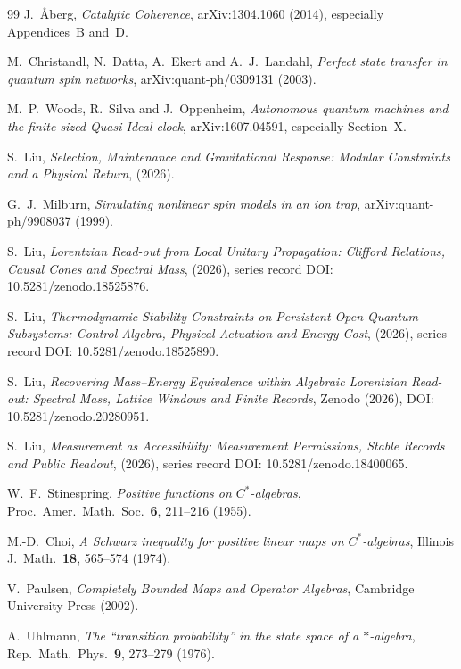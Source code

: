\begin{thebibliography}{99}
J.~\AA berg, \emph{Catalytic Coherence}, arXiv:1304.1060 (2014), especially Appendices~B and~D.

M.~Christandl, N.~Datta, A.~Ekert and A.~J.~Landahl,
\emph{Perfect state transfer in quantum spin networks}, arXiv:quant-ph/0309131 (2003).

M.~P.~Woods, R.~Silva and J.~Oppenheim,
\emph{Autonomous quantum machines and the finite sized Quasi-Ideal clock},
arXiv:1607.04591, especially Section~X.

S.~Liu, \emph{Selection, Maintenance and Gravitational Response: Modular Constraints and a Physical Return}, (2026).

G.~J.~Milburn, \emph{Simulating nonlinear spin models in an ion trap}, arXiv:quant-ph/9908037 (1999).

S.~Liu, \emph{Lorentzian Read-out from Local Unitary Propagation: Clifford Relations, Causal Cones and Spectral Mass}, (2026), series record DOI: 10.5281/zenodo.18525876.

S.~Liu, \emph{Thermodynamic Stability Constraints on Persistent Open Quantum Subsystems: Control Algebra, Physical Actuation and Energy Cost}, (2026), series record DOI: 10.5281/zenodo.18525890.

S.~Liu, \emph{Recovering Mass--Energy Equivalence within Algebraic Lorentzian Read-out: Spectral Mass, Lattice Windows and Finite Records}, Zenodo (2026), DOI: 10.5281/zenodo.20280951.

S.~Liu, \emph{Measurement as Accessibility: Measurement Permissions, Stable Records and Public Readout}, (2026), series record DOI: 10.5281/zenodo.18400065.

W.~F.~Stinespring, \emph{Positive functions on $C^*$-algebras}, Proc.\ Amer.\ Math.\ Soc.\ \textbf{6}, 211--216 (1955).

M.-D.~Choi, \emph{A Schwarz inequality for positive linear maps on $C^*$-algebras}, Illinois J.\ Math.\ \textbf{18}, 565--574 (1974).

V.~Paulsen, \emph{Completely Bounded Maps and Operator Algebras}, Cambridge University Press (2002).

A.~Uhlmann, \emph{The ``transition probability'' in the state space of a $*$-algebra}, Rep.\ Math.\ Phys.\ \textbf{9}, 273--279 (1976).


\end{thebibliography}

